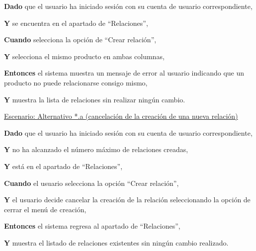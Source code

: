\textbf{Dado} que el usuario ha iniciado sesión con su cuenta de usuario correspondiente,\par
\textbf{Y} se encuentra en el apartado de \enquote{Relaciones},\par
\textbf{Cuando} selecciona la opción de \enquote{Crear relación},\par
\textbf{Y} selecciona el mismo producto en ambas columnas,\par
\textbf{Entonces} el sistema muestra un mensaje de error al usuario indicando que un producto no puede relacionarse consigo mismo,\par
\textbf{Y} muestra la lista de relaciones sin realizar ningún cambio.\par

\vspace{0.20cm}

\underline{Escenario: Alternativo *.a (cancelación de la creación de una nueva relación)}\par
\vspace{0.15cm}
\textbf{Dado} que el usuario ha iniciado sesión con su cuenta de usuario correspondiente,\par
\textbf{Y} no ha alcanzado el número máximo de relaciones creadas,\par
\textbf{Y} está en el apartado de \enquote{Relaciones},\par
\textbf{Cuando} el usuario selecciona la opción \enquote{Crear relación},\par
\textbf{Y} el usuario decide cancelar la creación de la relación seleccionando la opción de cerrar el menú de creación,\par
\textbf{Entonces} el sistema regresa al apartado de \enquote{Relaciones},\par
\textbf{Y} muestra el listado de relaciones existentes sin ningún cambio realizado.\par

\vspace{0.20cm}

